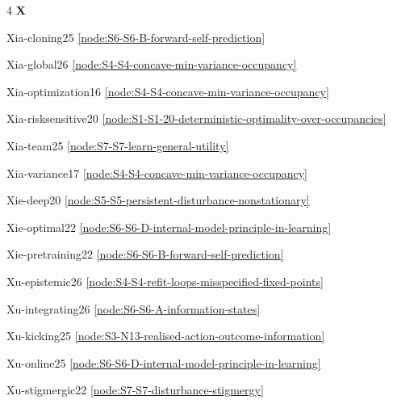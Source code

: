 \documentclass[10pt]{article}
\begin{document}
{\begin{multicols}{4}
\smallskip\textbf{X}\par
Xia-cloning25 \hfill \ref{node:S6-S6-B-forward-self-prediction}\par
Xia-global26 \hfill \ref{node:S4-S4-concave-min-variance-occupancy}\par
Xia-optimization16 \hfill \ref{node:S4-S4-concave-min-variance-occupancy}\par
Xia-risksensitive20 \hfill \ref{node:S1-S1-20-deterministic-optimality-over-occupancies}\par
Xia-team25 \hfill \ref{node:S7-S7-learn-general-utility}\par
Xia-variance17 \hfill \ref{node:S4-S4-concave-min-variance-occupancy}\par
Xie-deep20 \hfill \ref{node:S5-S5-persistent-disturbance-nonstationary}\par
Xie-optimal22 \hfill \ref{node:S6-S6-D-internal-model-principle-in-learning}\par
Xie-pretraining22 \hfill \ref{node:S6-S6-B-forward-self-prediction}\par
Xu-epistemic26 \hfill \ref{node:S4-S4-refit-loops-misspecified-fixed-points}\par
Xu-integrating26 \hfill \ref{node:S6-S6-A-information-states}\par
Xu-kicking25 \hfill \ref{node:S3-N13-realised-action-outcome-information}\par
Xu-online25 \hfill \ref{node:S6-S6-D-internal-model-principle-in-learning}\par
Xu-stigmergic22 \hfill \ref{node:S7-S7-disturbance-stigmergy}\par


\end{multicols}}
\end{document}
